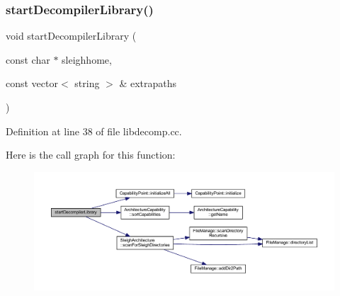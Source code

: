 \subsubsection{\texorpdfstring{startDecompilerLibrary()}{startDecompilerLibrary()}\hspace{0.1cm}{\footnotesize\ttfamily [3/3]}}
{\footnotesize\ttfamily void start\+Decompiler\+Library (\begin{DoxyParamCaption}\item[{const char $\ast$}]{sleighhome,  }\item[{const vector$<$ string $>$ \&}]{extrapaths }\end{DoxyParamCaption})}



Definition at line 38 of file libdecomp.\+cc.

Here is the call graph for this function\+:
\nopagebreak
\begin{figure}[H]
\begin{center}
\leavevmode
\includegraphics[width=350pt]{libdecomp_8hh_ac9748283f19f6d8692e4d806a3cf267e_cgraph}
\end{center}
\end{figure}
